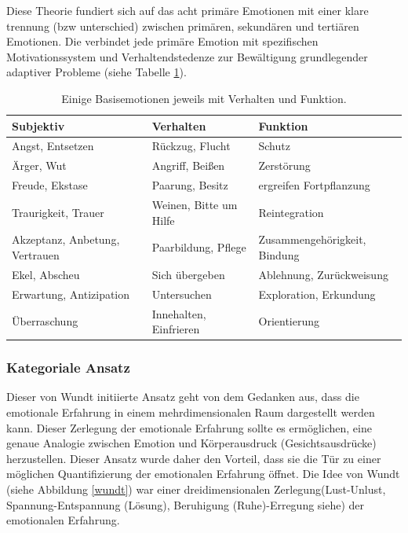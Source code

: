 Diese Theorie fundiert sich auf  das acht primäre Emotionen mit einer klare trennung (bzw unterschied) zwischen  primären, sekundären und tertiären Emotionen.
Die verbindet jede primäre Emotion mit spezifischen Motivationssystem und Verhaltendstedenze zur Bewältigung grundlegender adaptiver Probleme (siehe Tabelle \ref{verhalten-funktion}). 


\begin{table}[h] \centering
\begin{tabular}{| p{5.1cm} | p{5.1cm} | p{5.1cm} |}
\hline
\textbf{Subjektiv} & \textbf{Verhalten} & \textbf{Funktion} \\ \hline
Angst, Entsetzen & Rückzug, Flucht  & Schutz \\ \hline
Ärger, Wut & Angriff, Beißen & Zerstörung \\ \hline
Freude, Ekstase & Paarung, Besitz & ergreifen Fortpflanzung \\ \hline
Traurigkeit, Trauer & Weinen, Bitte um Hilfe & Reintegration \\ \hline
Akzeptanz, Anbetung, Vertrauen & Paarbildung, Pflege & Zusammengehörigkeit, Bindung \\ \hline
Ekel, Abscheu & Sich übergeben & Ablehnung, Zurückweisung \\ \hline
Erwartung, Antizipation & Untersuchen & Exploration, Erkundung \\ \hline
Überraschung & Innehalten, Einfrieren & Orientierung \\ \hline
\end{tabular} \caption[ Einige Basisemotionen jeweils mit Verhalten und Funktio ]{ Einige Basisemotionen jeweils mit Verhalten und Funktion\cite{basic_emotions_theories}. } \label{verhalten-funktion}
\end{table}






\subsubsection{Kategoriale Ansatz} \label{kategoriale-ansatz}

Dieser von Wundt\cite{basic_emotions_theories} initiierte Ansatz geht von dem Gedanken aus, dass die emotionale Erfahrung in einem mehrdimensionalen Raum dargestellt werden kann. 
Dieser Zerlegung der emotionale Erfahrung  sollte es ermöglichen, eine genaue Analogie zwischen Emotion und Körperausdruck (Gesichtsausdrücke) herzustellen. 
Dieser Ansatz wurde  daher den Vorteil, dass sie die Tür zu einer möglichen Quantifizierung der emotionalen Erfahrung öffnet. 
Die Idee von Wundt (siehe Abbildung \ref{wundt})  war einer dreidimensionalen Zerlegung(Lust-Unlust, Spannung-Entspannung (Lösung), Beruhigung (Ruhe)-Erregung siehe) der emotionalen Erfahrung. 


